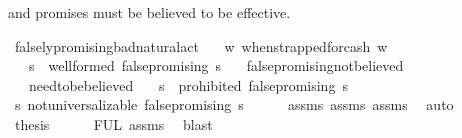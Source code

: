 \begin{isabellebody}
\begin{isamarkuptext}
and promises must be believed to be effective.%
\end{isamarkuptext}\isamarkuptrue%
\isamarkupfalse%
\ falsely{\isacharunderscore}promising{\isacharunderscore}bad{\isacharunderscore}natural{\isacharunderscore}act{\isacharcolon}\isanewline
\ \ \ {\isachardoublequoteopen}{\isasymforall}w{\isachardot}\ when{\isacharunderscore}strapped{\isacharunderscore}for{\isacharunderscore}cash\ w{\isachardoublequoteclose}\isanewline
%
\isanewline
\ \ \ {\isachardoublequoteopen}{\isasymforall}s{\isachardot}\ {\isasymTurnstile}\ {\isacharparenleft}well{\isacharunderscore}formed\ false{\isacharunderscore}promising\ s{\isacharparenright}{\isachardoublequoteclose}\isanewline
%
\isanewline
\ \ \ false{\isacharunderscore}promising{\isacharunderscore}not{\isacharunderscore}believed\isanewline
\ \ \ need{\isacharunderscore}to{\isacharunderscore}be{\isacharunderscore}believed\isanewline
%
\isanewline
\ \ \ {\isachardoublequoteopen}{\isasymforall}s{\isachardot}\ {\isasymTurnstile}\ {\isacharparenleft}prohibited\ false{\isacharunderscore}promising\ s{\isacharparenright}{\isachardoublequoteclose}\isanewline
%
\isadelimproof
%
\endisadelimproof
%
\isatagproof
{}\isamarkupfalse%
{\isacharminus}\isanewline
\ \ \isamarkupfalse%
\ {\isachardoublequoteopen}{\isasymforall}s{\isachardot}\ not{\isacharunderscore}universalizable\ false{\isacharunderscore}promising\ s{\isachardoublequoteclose}\isanewline
\ \ \ \ \isamarkupfalse%
\ assms{\isacharparenleft}{}{\isacharparenright}\ assms{\isacharparenleft}{}{\isacharparenright}\ assms{\isacharparenleft}{}{\isacharparenright}\ \isamarkupfalse%
\ auto\isanewline
\ \ \isamarkupfalse%
\ {\isacharquery}thesis\isanewline
\ \ \ \ \isamarkupfalse%
\ FUL\ assms{\isacharparenleft}{}{\isacharparenright}\ \isamarkupfalse%
\ blast\isanewline
{}\isamarkupfalse%
\isanewline
%
%
\endisatagproof
{\isafoldproof}%
%
\isadelimproof
%
\endisadelimproof
%
\begin{isamarkuptext}%

\end{isamarkuptext}
\end{isabellebody}
